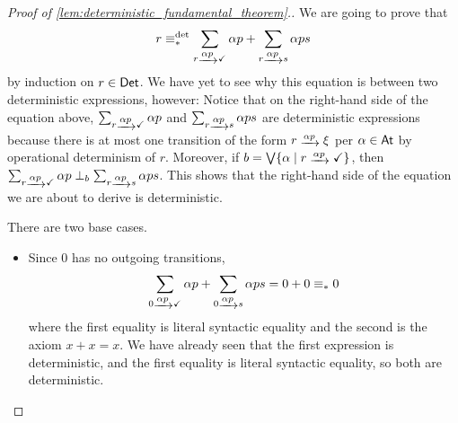 \documentclass[orivec,envcountsect,envcountsame]{llncs}
\begin{document}
\begin{proof}[Proof of \cref{lem:deterministic_fundamental_theorem}.]
	We are going to prove that
	\[
	r \equiv_*^{\det} \sum_{r\tr{\alpha p} \checkmark} \alpha p + \sum_{r\tr{\alpha p} s} \alpha ps
	\]
	by induction on \(r \in \mathsf{Det}\).
	We have yet to see why this equation is between two deterministic expressions, however:
	Notice that on the right-hand side of the equation above, \(\sum_{r\tr{\alpha p} \checkmark} \alpha p\) and \(\sum_{r\tr{\alpha p} s} \alpha ps\) are deterministic expressions because there is at most one transition of the form \(r \tr{\alpha p} \xi\) per \(\alpha \in \mathsf{At}\) by operational determinism of \(r\).
	Moreover, if \(b = \bigvee\{\alpha \mid r \tr{\alpha p} \checkmark\}\), then \(\sum_{r\tr{\alpha p} \checkmark} \alpha p \perp_b \sum_{r\tr{\alpha p} s} \alpha ps\).
	This shows that the right-hand side of the equation we are about to derive is deterministic.

	There are two base cases.
	\begin{itemize}
		\item Since \(0\) has no outgoing transitions,
		\[
		\sum_{0\tr{\alpha p} \checkmark} \alpha p + \sum_{0\tr{\alpha p} s} \alpha ps  = 0 + 0 \equiv_* 0
		\]
		where the first equality is literal syntactic equality and the second is the axiom \(x + x = x\).
		We have already seen that the first expression is deterministic, and the first equality is literal syntactic equality, so both are deterministic.


\end{itemize}
\end{proof}
\end{document}
